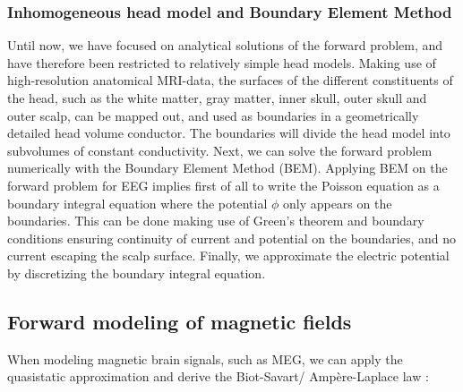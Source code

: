 \documentclass[preprint,10pt,authoryear]{elsarticle}
\begin{document}
\subsubsection{Inhomogeneous head model and Boundary Element Method}\label{subsubsec:eeg_BEM}
Until now, we have focused on analytical solutions of the forward problem, and have therefore been restricted to relatively simple head models. Making use of high-resolution anatomical MRI-data, the surfaces of the different constituents of the head, such as the white matter, gray matter, inner skull, outer skull and outer scalp, can be mapped out, and used as boundaries in a geometrically detailed head volume conductor. The boundaries will divide the head model into subvolumes of constant conductivity. Next, we can solve the forward problem numerically with the Boundary Element Method (BEM). Applying BEM on the forward problem for EEG implies first of all to write the Poisson equation as a boundary integral equation where the potential $\phi$ only appears on the boundaries. This can be done making use of Green's theorem and boundary conditions ensuring continuity of current and potential on the boundaries, and no current escaping the scalp surface. Finally, we approximate the electric potential by discretizing the boundary integral equation. 



\subsection{Forward modeling of magnetic fields}
When modeling magnetic brain signals, such as MEG, we can apply the quasistatic approximation and derive the Biot-Savart/ Ampère-Laplace law \citep{GRIFFITHS1999}:
\end{document}
